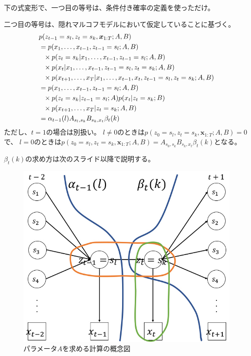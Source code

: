\documentclass[aspectratio=169,unicode,dvipdfmx,14pt]{beamer}
\begin{document}
\begin{frame}{}
\FontMath
下の式変形で、一つ目の等号は、条件付き確率の定義を使っただけ。

二つ目の等号は、隠れマルコフモデルにおいて仮定していることに基づく。
\vspace{-.1in}
\begin{align}
& p(z_{t-1}=s_l, z_t=s_k, \bm{x}_{1:T};A,B)
\notag \\ &
= p(x_1,\ldots, x_{t-1}, z_{t-1}=s_l;A,B)
\notag \\ & \mbox{ \ } \times
p(z_t=s_k | x_1,\ldots, x_{t-1}, z_{t-1}=s_l;A,B)
\notag \\ & \mbox{ \ } \times
p(x_t| x_1,\ldots, x_{t-1}, z_{t-1}=s_l, z_t=s_k;A,B )
\notag \\ & \mbox{ \ } \times
p(x_{t+1}, \ldots, x_T | x_1,\ldots, x_{t-1}, x_t, z_{t-1}=s_l, z_t=s_k;A,B)
\notag \\ &
= p(x_1,\ldots, x_{t-1}, z_{t-1}=s_l;A,B) 
\notag \\ & \mbox{ \ } \times
p(z_t=s_k | z_{t-1}=s_l;A)
p(x_t| z_t=s_k;B)
\notag \\ & \mbox{ \ } \times
p(x_{t+1}, \ldots, x_T | z_t=s_k;A,B)
\notag \\ &
= \alpha_{t-1}(l) A_{s_l,s_k} B_{s_k,x_t} \beta_t(k)
\end{align}
ただし、$t=1$の場合は別扱い。
$l\neq 0$のときは$p(z_0=s_l, z_t=s_k, \bm{x}_{1:T};A,B)=0$で、
$l = 0$のときは$p(z_0=s_l, z_t=s_k, \bm{x}_{1:T};A,B)=A_{s_0,s_k} B_{s_k,x_t} \beta_t(k)$となる。

$\beta_t(k)$の求め方は次のスライド以降で説明する。
\end{frame}

\begin{frame}
\begin{figure}[htbp]
\begin{center}
\includegraphics[scale=.38]{HMM_EM.jpg}
\caption{パラメータ$A$を求める計算の概念図}
\label{fig:HMM_A}
\end{center}
\end{figure}
\end{frame}
\end{document}
